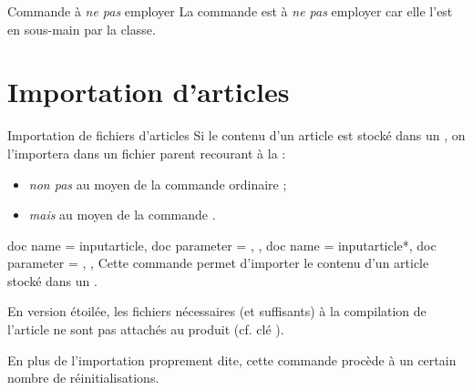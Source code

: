 \documentclass{letgut}
\begin{document}

\begin{dbwarning}{Commande  à \emph{ne pas} employer}{}
  La commande  est à \emph{ne pas} employer car elle
  l'est en sous-main par la classe.
\end{dbwarning}

\section{Importation d'articles}
\label{sec:import-dart}

\begin{dbwarning}{Importation de fichiers d'articles}{}
  Si le contenu d'un article est stocké dans un ,
  on l'importera dans un fichier parent recourant à la  :
  \begin{itemize}
  \item \emph{non pas} au moyen de la commande ordinaire  ;
  \item \emph{mais}  au moyen de la commande .
  \end{itemize}
\end{dbwarning}

\begin{docCommands}
  {
    {
      doc name = inputarticle,
      doc parameter = ,
    },
    {
      doc name = inputarticle*,
      doc parameter = ,
    },
  }
  Cette commande permet d'importer le contenu d'un article stocké dans un
  .

  En version étoilée, les fichiers nécessaires (et suffisants) à la compilation
  de l'article ne sont pas attachés au \pdf{} produit (cf. clé
  ).

  En plus de l'importation proprement dite, cette commande procède à un certain
  nombre de réinitialisations.
\end{docCommands}
\end{document}
